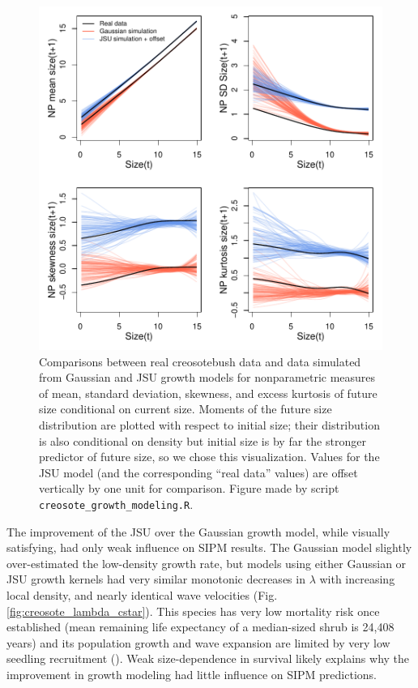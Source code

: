 \documentclass[12pt]{article}
\begin{document}
\begin{figure}[tbp]
	\centering
	\includegraphics[width=1.0\textwidth]{figures/creosote_JSU_fit.pdf}
	\caption{Comparisons between real creosotebush data and data simulated from Gaussian and JSU growth models for nonparametric measures of mean, standard deviation, skewness, and excess kurtosis of future size conditional on current size. 
		Moments of the future size distribution are plotted with respect to initial size; their distribution is also conditional on density but initial size is by far the stronger predictor of future size, so we chose this visualization. 
		Values for the JSU model (and the corresponding ``real data'' values) are offset vertically by one unit for comparison. Figure made by script \texttt{creosote\_growth\_modeling.R}.}
	\label{fig:creosote_JSU}
\end{figure} 

The improvement of the JSU over the Gaussian growth model, while visually satisfying, had only weak influence on SIPM results. 
The Gaussian model slightly over-estimated the low-density growth rate, but models using either Gaussian or JSU growth kernels had very similar monotonic decreases in $\lambda$ with increasing local density, and nearly identical wave velocities (Fig. \ref{fig:creosote_lambda_cstar}). 
This species has very low mortality risk once established (mean remaining life expectancy of a median-sized shrub is 24,408 years) and its population growth and wave expansion are limited by very low seedling recruitment (\citep{drees2023demography}). 
Weak size-dependence in survival likely explains why the improvement in growth modeling had little influence on SIPM predictions. 
\end{document}
